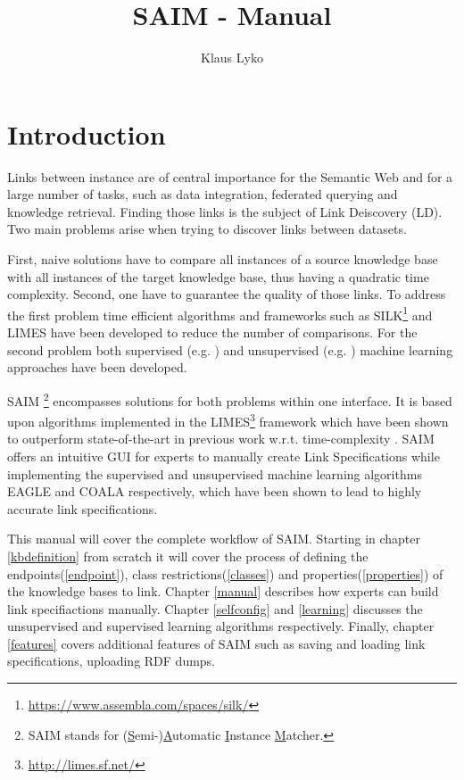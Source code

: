 \documentclass[oneside,a4paper,12pt]{memoir}
\begin{document}
\title{SAIM - Manual}
\author{Klaus Lyko}                                                  
\maketitle

\chapter{Introduction}
Links between instance are of central importance for the Semantic Web and for a large number of tasks, such as data integration, federated querying and knowledge retrieval. Finding those links is the subject of Link Deiscovery (LD).
Two main problems arise when trying to discover links between datasets.

First, naive solutions have to compare all instances of a source knowledge base with all instances of the target knowledge base, thus having a quadratic time complexity. Second, one have to guarantee the quality of those links. 
To address the first problem time efficient algorithms and frameworks such as SILK\footnote{\url{https://www.assembla.com/spaces/silk/}} and LIMES\cite{NGAU11} have been developed to reduce the number of comparisons. For the second problem both supervised (e.g. \cite{NGLY12, NGO+13}) and unsupervised ({e.g. \cite{NIK+12}}) machine learning approaches have been developed.

SAIM \footnote{SAIM stands for (\uline{S}emi-)\uline{A}utomatic \uline{I}nstance \uline{M}atcher.}  encompasses solutions for both problems within one interface. It is based upon algorithms implemented in the LIMES\footnote{\url{http://limes.sf.net/}} framework which have been shown to outperform state-of-the-art in previous work w.r.t. time-complexity \cite{NGON12c}. SAIM offers an intuitive GUI for experts to manually create Link Specifications while implementing the supervised and unsupervised machine learning algorithms EAGLE \cite{NGLY12}	and COALA \cite{NGO+13} respectively, which have been shown to lead to highly accurate link specifications.

This manual will cover the complete workflow of SAIM. Starting in chapter \ref{kbdefinition} from scratch it will cover the process of defining the endpoints(\ref{endpoint}), class restrictions(\ref{classes}) and properties(\ref{properties}) of the knowledge bases to link. Chapter \ref{manual} describes how experts can build link specifiactions manually. Chapter \ref{selfconfig} and \ref{learning} discusses the unsupervised and supervised learning algorithms respectively. Finally, chapter \ref{features} covers additional features of SAIM such as saving and loading link specifications, uploading RDF dumps.
\end{document}
